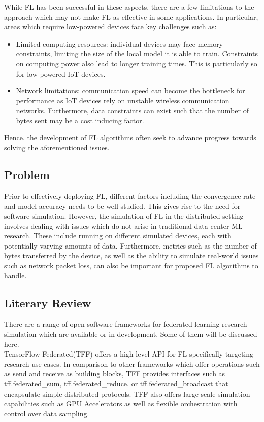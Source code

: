 \documentclass[12pt]{article}
\begin{document}
While FL has been successful in these aspects, there are a few limitations to the approach which may
not make FL as effective in some applications. In particular, areas which require low-powered
devices face key challenges such as:
\begin{itemize}
  \item Limited computing resources: individual devices may face memory constraints, limiting the
    size of the local model it is able to train. Constraints on computing power also lead to
    longer training times. This is particularly so for low-powered IoT devices.
  \item Network limitations: communication speed can become the bottleneck for performance as IoT
    devices rely on unstable wireless communication networks. Furthermore, data constraints can
    exist such that the number of bytes sent may be a cost inducing factor.
\end{itemize}

Hence, the development of FL algorithms often seek to advance progress towards solving the
aforementioned issues.

\subsection{Problem}
Prior to effectively deploying FL, different factors including the convergence rate and
model accuracy needs to be well studied. This gives rise to the need for software simulation. However, the
simulation of FL in the distributed setting involves dealing with
issues which do not arise in traditional data center ML research. These include running on different simulated
devices, each with potentially varying amounts of data. Furthermore, metrics such as the number of
bytes transferred by the device, as well as the ability to simulate real-world issues such as
network packet loss, can also be important for proposed FL algorithms to handle.

\subsection{Literary Review}
There are a range of open software frameworks for federated learning research simulation which are
available or in development. Some of them will be discussed here.\\

TensorFlow Federated(TFF)\cite{tff} offers a high level API for FL specifically targeting research use
cases. In comparison to other frameworks which offer operations such as send and receive as building
blocks, TFF provides interfaces such as tff.federated\_sum, tff.federated\_reduce, or
tff.federated\_broadcast that encapsulate simple distributed protocols. TFF also offers large scale
simulation capabilities such as GPU Accelerators as well as flexible orchestration with control over
data sampling.\\
\end{document}
